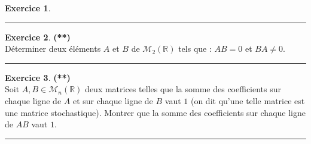 \documentclass[a4paper,11pt]{article}
\theoremstyle{definition}
\newtheorem{exo}{Exercice} %
\begin{document}
\begin{minipage}{1\linewidth}
\begin{minipage}[t]{0.48\linewidth}
\begin{exo}
	
	
	\centering
	\rule{1\linewidth}{0.6pt}
\end{exo}


\begin{exo}\textbf{(**)}\quad\\[0.2cm]
Déterminer deux éléments $A$ et $B$ de
$\mathcal M_2({\mathbb R})$ tels que : $AB=0$ et $BA\not = 0$.

	
	
	\centering
	\rule{1\linewidth}{0.6pt}
\end{exo}

\begin{exo}\textbf{(**)}\quad\\[0.2cm]
Soit $A,B\in\mathcal M_n(\mathbb R)$ deux matrices telles que la somme des coefficients sur chaque ligne de $A$ et sur chaque ligne de $B$ vaut $1$
(on dit qu'une telle matrice est une matrice stochastique).
Montrer que la somme des coefficients sur chaque ligne de $AB$ vaut $1$.

	\centering
\rule{1\linewidth}{0.6pt}
\end{exo}



\end{minipage}
\end{minipage}
\end{document}
